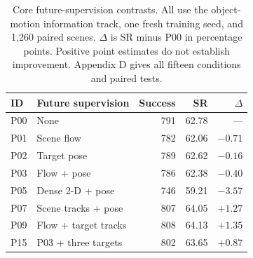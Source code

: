 \begin{table}[t]
\centering
\caption{Core future-supervision contrasts. All use the object-motion information
track, one fresh training seed, and 1,260 paired scenes. $\Delta$ is SR minus P00
in percentage points. Positive point estimates do not establish improvement.
Appendix D gives all fifteen conditions and paired tests.}
\label{tab:q2_results}
\small
\begin{tabularx}{\columnwidth}{@{}lXrrr@{}}
\toprule
ID & Future supervision & Success & SR & $\Delta$ \\
\midrule
P00 & None & 791 & 62.78 & --- \\
P01 & Scene flow & 782 & 62.06 & $-0.71$ \\
P02 & Target pose & 789 & 62.62 & $-0.16$ \\
P03 & Flow + pose & 786 & 62.38 & $-0.40$ \\
P05 & Dense 2-D + pose & 746 & 59.21 & $-3.57$ \\
P07 & Scene tracks + pose & 807 & 64.05 & $+1.27$ \\
P09 & Flow + target tracks & 808 & 64.13 & $+1.35$ \\
P15 & P03 + three targets & 802 & 63.65 & $+0.87$ \\
\bottomrule
\end{tabularx}
\end{table}
